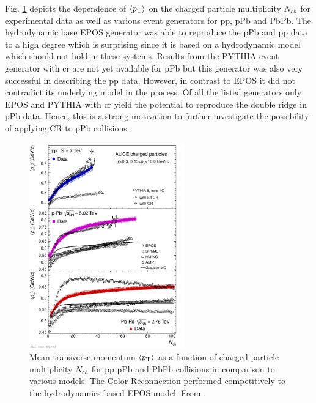 Fig. \ref{fig:cf_comparison} depicts the dependence of $\left< \pt \right>$ on the charged particle multiplicity $N_{ch}$ for experimental data as well as various event generators for \gls{pp}, \gls{pPb} and \gls{PbPb}. The hydrodynamic base EPOS generator was able to reproduce the \gls{pPb} and \gls{pp} data to a high degree which is surprising since it is based on a hydrodynamic model which should not hold in these systems. Results from the PYTHIA event generator with \gls{cr} are not yet available for \gls{pPb} but this generator was also very successful in describing the \gls{pp} data. However, in contrast to EPOS it did not contradict its underlying model in the process. Of all the listed generators only EPOS and PYTHIA with \gls{cr} yield the potential to reproduce the double ridge in \gls{pPb} data. Hence, this is a strong motivation to further investigate the possibility of applying CR to \gls{pPb} collisions.

\begin{figure}
  \centering
  \includegraphics[width=0.6\textwidth]{figures/cr_comparisons.pdf}
  \caption[Mean transverse momentum $\left< \pt \right>$ as a function of charged particle multiplicity $N_{ch}$ for \gls{pp} \gls{pPb} and \gls{PbPb} collisions in comparison to various models.]{Mean transverse momentum $\left< \pt \right>$ as a function of charged particle multiplicity $N_{ch}$ for \gls{pp} \gls{pPb} and \gls{PbPb} collisions in comparison to various models. The Color Reconnection performed competitively to the hydrodynamics based EPOS model. From \cite{cr_epos}.}
  \label{fig:cf_comparison}
\end{figure}


